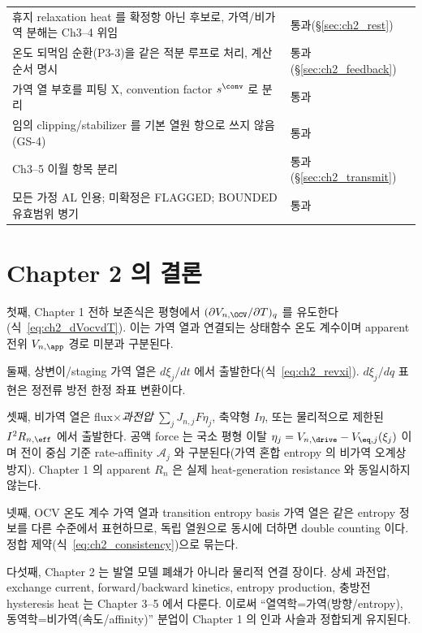 {\begin{longtable}{p{} p{}}
휴지 relaxation heat 를 확정항 아닌 후보로, 가역/비가역 분해는 Ch3--4 위임 & 통과(\S\ref{sec:ch2_rest}) \\
온도 되먹임 순환(P3-3)을 같은 적분 루프로 처리, 계산 순서 명시 & 통과(\S\ref{sec:ch2_feedback}) \\
가역 열 부호를 피팅 X, convention factor $s^{\conv}$ 로 분리 & 통과 \\
임의 clipping/stabilizer 를 기본 열원 항으로 쓰지 않음(GS-4) & 통과 \\
Ch3--5 이월 항목 분리 & 통과(\S\ref{sec:ch2_transmit}) \\
모든 가정 AL 인용; 미확정은 FLAGGED; BOUNDED 유효범위 병기 & 통과 \\
\bottomrule
\end{longtable}
}

\section{Chapter 2 의 결론}\label{sec:ch2_concl}
첫째, Chapter 1 전하 보존식은 평형에서 $(\partial V_{n,\OCV}/\partial T)_q$ 를 유도한다(식~\eqref{eq:ch2_dVocvdT}).
이는 가역 열과 연결되는 상태함수 온도 계수이며 apparent 전위 $V_{n,\app}$ 경로 미분과 구분된다.

둘째, 상변이/staging 가역 열은 $d\xi_j/dt$ 에서 출발한다(식~\eqref{eq:ch2_revxi}). $d\xi_j/dq$ 표현은
정전류 방전 한정 좌표 변환이다.

셋째, 비가역 열은 flux$\times$\emph{과전압} $\sum_jJ_{n,j}F\eta_j$, 축약형 $I\eta$, 또는 물리적으로 제한된
$I^2R_{n,\eff}$ 에서 출발한다. 공액 force 는 국소 평형 이탈 $\eta_j=V_{n,\drive}-V_{\eq,j}(\xi_j)$ 이며
전이 중심 기준 rate-affinity $\mathcal A_j$ 와 구분된다(가역 혼합 entropy 의 비가역 오계상 방지). Chapter 1 의
apparent $R_n$ 은 실제 heat-generation resistance 와 동일시하지 않는다.

넷째, OCV 온도 계수 가역 열과 transition entropy basis 가역 열은 같은 entropy 정보를 다른 수준에서
표현하므로, 독립 열원으로 동시에 더하면 double counting 이다. 정합 제약(식~\eqref{eq:ch2_consistency})으로 묶는다.

다섯째, Chapter 2 는 발열 모델 폐쇄가 아니라 물리적 연결 장이다. 상세 과전압, exchange current,
forward/backward kinetics, entropy production, 충방전 hysteresis heat 는 Chapter 3--5 에서 다룬다. 이로써
``열역학=가역(방향/entropy), 동역학=비가역(속도/affinity)'' 분업이 Chapter 1 의 인과 사슬과 정합되게 유지된다.


